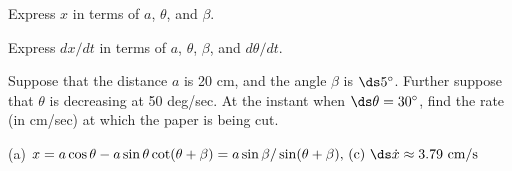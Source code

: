 \begin{exercises}
\begin{exercise}
 Express $x$ in terms of $a$, $\theta$, and $\beta$.

 Express $dx/dt$ in terms of $a$,
$\theta$, $\beta$, and $d\theta/dt$.

 Suppose that the distance $a$ is 20 cm, and the
angle $\beta$ is $\ds 5^\circ$.  Further suppose that $\theta$ is
decreasing at 50
deg/sec.  At the instant when $\ds \theta=30^\circ$, find the rate (in
cm/sec) at which the paper is being cut.
\begin{answer} (a) $x=a\cos\theta-a\sin\theta\cot(\theta+\beta)=
\hbox{$a\sin\beta/\sin(\theta+\beta$), (c) $\ds \dot x\approx 3.79$ cm/s}$
\end{answer}\end{exercise}




\end{exercises}
